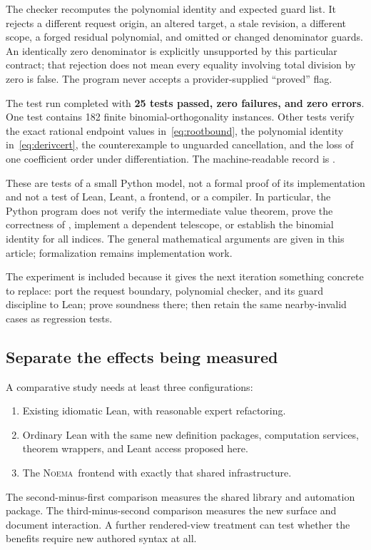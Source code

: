 \documentclass[11pt,a4paper]{article}
\newcommand{\code}[1]{\texttt{\detokenize{#1}}}
\newcommand{\Noema}{\textsc{Noema}}
\theoremstyle{remark}\newtheorem{example}[proposition]{Example}
\begin{document}
The checker recomputes the polynomial identity and expected guard list. It rejects a different request origin, an altered target, a stale revision, a different scope, a forged residual polynomial, and omitted or changed denominator guards. An identically zero denominator is explicitly unsupported by this particular contract; that rejection does not mean every equality involving total division by zero is false. The program never accepts a provider-supplied ``proved'' flag.

The test run completed with \textbf{25 tests passed, zero failures, and zero errors}. One test contains 182 finite binomial-orthogonality instances. Other tests verify the exact rational endpoint values in~\eqref{eq:rootbound}, the polynomial identity in~\eqref{eq:derivcert}, the counterexample to unguarded cancellation, and the loss of one coefficient order under differentiation. The machine-readable record is .

These are tests of a small Python model, not a formal proof of its implementation and not a test of Lean, Leant, a frontend, or a compiler. In particular, the Python program does not verify the intermediate value theorem, prove the correctness of \code{Fraction}, implement a dependent telescope, or establish the binomial identity for all indices. The general mathematical arguments are given in this article; formalization remains implementation work.

The experiment is included because it gives the next iteration something concrete to replace: port the request boundary, polynomial checker, and its guard discipline to Lean; prove soundness there; then retain the same nearby-invalid cases as regression tests.

\subsection{Separate the effects being measured}
A comparative study needs at least three configurations:
\begin{enumerate}
\item Existing idiomatic Lean, with reasonable expert refactoring.
\item Ordinary Lean with the same new definition packages, computation services, theorem wrappers, and Leant access proposed here.
\item The \Noema\ frontend with exactly that shared infrastructure.
\end{enumerate}
The second-minus-first comparison measures the shared library and automation package. The third-minus-second comparison measures the new surface and document interaction. A further rendered-view treatment can test whether the benefits require new authored syntax at all.
\end{document}
